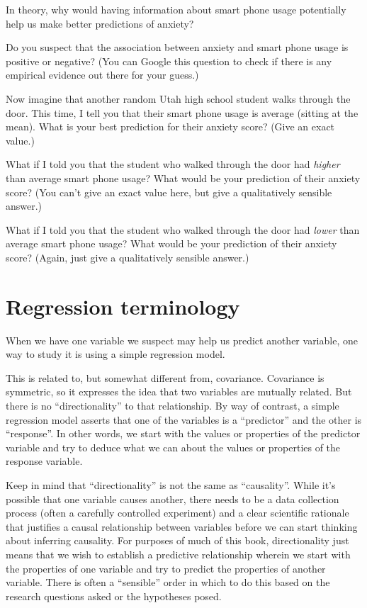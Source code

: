\documentclass[
]{book}
\begin{document}
In theory, why would having information about smart phone usage potentially help us make better predictions of anxiety?

Do you suspect that the association between anxiety and smart phone usage is positive or negative? (You can Google this question to check if there is any empirical evidence out there for your guess.)

Now imagine that another random Utah high school student walks through the door. This time, I tell you that their smart phone usage is average (sitting at the mean). What is your best prediction for their anxiety score? (Give an exact value.)

What if I told you that the student who walked through the door had \emph{higher} than average smart phone usage? What would be your prediction of their anxiety score? (You can't give an exact value here, but give a qualitatively sensible answer.)

What if I told you that the student who walked through the door had \emph{lower} than average smart phone usage? What would be your prediction of their anxiety score? (Again, just give a qualitatively sensible answer.)

\hypertarget{simple-terminology}{%
\section{Regression terminology}\label{simple-terminology}}

When we have one variable we suspect may help us predict another variable, one way to study it is using a simple regression model.

This is related to, but somewhat different from, covariance. Covariance is symmetric, so it expresses the idea that two variables are mutually related. But there is no ``directionality'' to that relationship. By way of contrast, a simple regression model asserts that one of the variables is a ``predictor'' and the other is ``response''. In other words, we start with the values or properties of the predictor variable and try to deduce what we can about the values or properties of the response variable.

Keep in mind that ``directionality'' is not the same as ``causality''. While it's possible that one variable causes another, there needs to be a data collection process (often a carefully controlled experiment) and a clear scientific rationale that justifies a causal relationship between variables before we can start thinking about inferring causality. For purposes of much of this book, directionality just means that we wish to establish a predictive relationship wherein we start with the properties of one variable and try to predict the properties of another variable. There is often a ``sensible'' order in which to do this based on the research questions asked or the hypotheses posed.
\end{document}
